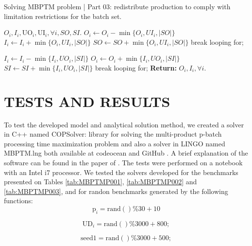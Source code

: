 \documentclass[10pt,fleqn,a4paper,twoside]{article}
\begin{document}
\begin{algorithm}
\caption{Solving MBPTM problem | Part 03: redistribute production to comply with limitation restrictions for the batch set.}\label{alg:part03}
\begin{algorithmic}
\Require $O_i, I_i, \textrm{UO}_i, \textrm{UI}_i, \forall i, SO, SI$.
	\State $O_i \gets O_i - \min\{ O_i, UI_i, |SO|\}$
	\State $I_i \gets I_i + \min\{ O_i, UI_i, |SO|\}$
	\State $SO \gets SO + \min\{ O_i, UI_i, |SO|\}$
		break looping for;
	\EndIf
\EndFor
\EndIf

	\State $I_i \gets I_i - \min\{ I_i, UO_i, |SI|\}$
	\State $O_i \gets O_i + \min\{ I_i, UO_i, |SI|\}$
	\State $SI \gets SI + \min\{ I_i, UO_i, |SI|\}$
		break looping for;
	\EndIf
\EndFor
\EndIf
\State \textbf{Return:} $O_i, I_i, \forall i$.
\end{algorithmic}
\end{algorithm}

\section{TESTS AND RESULTS}
\label{sec:results}

To test the developed model and analytical solution method, we created a solver in C++ named COPSolver: library for solving the multi-product p-batch processing time maximization problem and also a solver in LINGO named MBPTM.lng both available at codeocean and GitHub \citep{COPSolver2023}. A brief explanation of the software can be found in the paper of \cite{Fraga2023}. The tests were performed on a notebook with an Intel i7 processor. We tested the solvers developed for the benchmarks presented on Tables \ref{tab:MBPTMP001}, \ref{tab:MBPTMP002} and \ref{tab:MBPTMP003}, and for randon benchmarks generated by the following functions: \\

\begin{equation}
\textrm{p}_i = \textrm{rand}()\%30 + 10
\end{equation}

\begin{equation}
\textrm{UD}_i = \textrm{rand}()\%3000 + 800;
\end{equation}

\begin{equation}
 \textrm{seed1} = \textrm{rand}()\%3000 + 500;
\end{equation}
\end{document}
